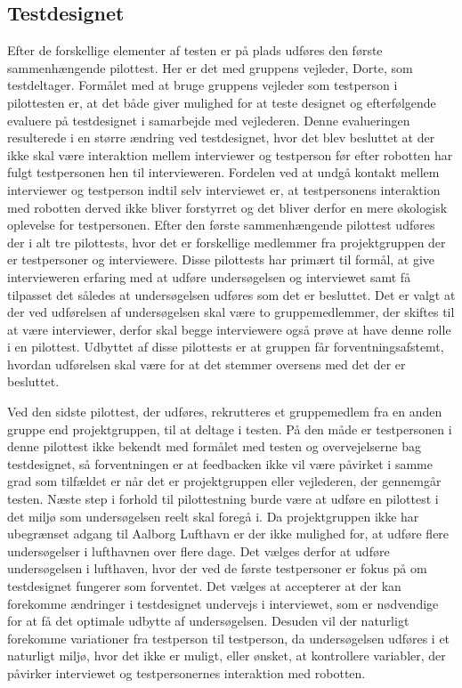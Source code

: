 \subsection{Testdesignet}
\label{ParametrePilotTestdesign}
%
Efter de forskellige elementer af testen er på plads udføres den første sammenhængende pilottest. Her er det med gruppens vejleder, Dorte, som testdeltager. Formålet med at bruge gruppens vejleder som testperson i pilottesten er, at det både giver mulighed for at teste designet og efterfølgende evaluere på testdesignet i samarbejde med vejlederen. Denne evalueringen resulterede i en større ændring ved testdesignet, hvor det blev besluttet at der ikke skal være interaktion mellem interviewer og testperson før efter robotten har fulgt testpersonen hen til intervieweren. Fordelen ved at undgå kontakt mellem interviewer og testperson indtil selv interviewet er, at testpersonens interaktion med robotten derved ikke bliver forstyrret og det bliver derfor en mere økologisk oplevelse for testpersonen. \blankline
%
Efter den første sammenhængende pilottest udføres der i alt tre pilottests, hvor det er forskellige medlemmer fra projektgruppen der er testpersoner og interviewere. Disse pilottests har primært til formål, at give intervieweren erfaring med at udføre undersøgelsen og interviewet samt få tilpasset det således at undersøgelsen udføres som det er besluttet. Det er valgt at der ved udførelsen af undersøgelsen skal være to gruppemedlemmer, der skiftes til at være interviewer, derfor skal begge interviewere også prøve at have denne rolle i en pilottest. Udbyttet af disse pilottests er at gruppen får forventningsafstemt, hvordan udførelsen skal være for at det stemmer oversens med det der er besluttet.

Ved den sidste pilottest, der udføres, rekrutteres et gruppemedlem fra en anden gruppe end projektgruppen, til at deltage i testen. På den måde er testpersonen i denne pilottest ikke bekendt med formålet med testen og overvejelserne bag testdesignet, så forventningen er at feedbacken ikke vil være påvirket i samme grad som tilfældet er når det er projektgruppen eller vejlederen, der gennemgår testen. \blankline
%
Næste step i forhold til pilottestning burde være at udføre en pilottest i det miljø som undersøgelsen reelt skal foregå i. Da projektgruppen ikke har ubegrænset adgang til Aalborg Lufthavn er der ikke mulighed for, at udføre flere undersøgelser i lufthavnen over flere dage. Det vælges derfor at udføre undersøgelsen i lufthaven, hvor der ved de første testpersoner er fokus på om testdesignet fungerer som forventet. Det vælges at accepterer at der kan forekomme ændringer i testdesignet undervejs i interviewet, som er nødvendige for at få det optimale udbytte af undersøgelsen. Desuden vil der naturligt forekomme variationer fra testperson til testperson, da undersøgelsen udføres i et naturligt miljø, hvor det ikke er muligt, eller ønsket, at kontrollere variabler, der påvirker interviewet og testpersonernes interaktion med robotten. 
